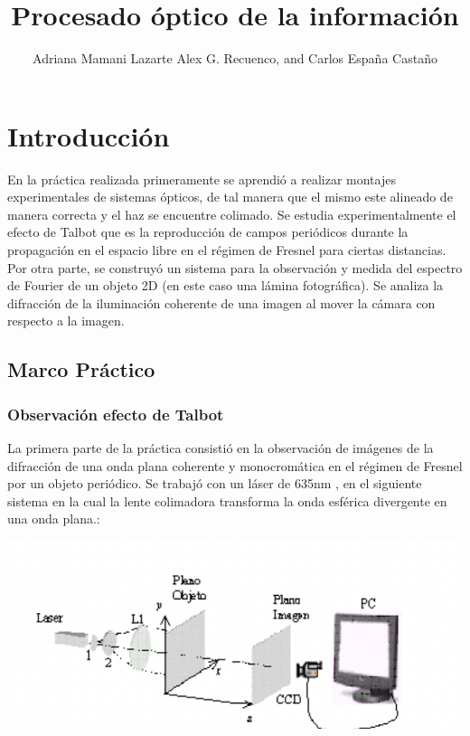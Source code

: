 \documentclass{./packages/optica-article}
\begin{document}
\title{Procesado óptico de la información}

\author{Adriana Mamani Lazarte Alex G. Recuenco, and Carlos España Castaño}

\address{Universidad Complutense de Madrid, Madrid, PC 28040, España}

\section{Introducción}
En la práctica realizada primeramente se aprendió a realizar montajes experimentales de sistemas ópticos, de tal manera que el mismo este alineado de manera correcta y el haz se encuentre colimado. Se estudia experimentalmente el efecto de Talbot que es la reproducción de campos periódicos durante la propagación en el espacio
libre en el régimen de Fresnel para ciertas distancias. Por otra parte, se construyó un sistema para la observación y medida del espectro de Fourier de un objeto 2D (en este caso una lámina fotográfica). Se analiza la difracción de la iluminación coherente de una imagen al mover la cámara con respecto a la imagen.


\subsection{Marco Práctico}
\subsubsection{Observación efecto de Talbot}

	      La primera parte de la práctica consistió en la observación de imágenes de la difracción de una onda plana coherente y monocromática en el régimen de Fresnel por un objeto periódico.
	      Se trabajó con un láser de 635nm , en el siguiente sistema en la cual la lente colimadora transforma la onda esférica divergente en una onda plana.:

	      \begin{center}
		      \includegraphics[scale=1]{sistematalbot.png}
		      \label{fig:talbot} %
	      \end{center}
\end{document}
